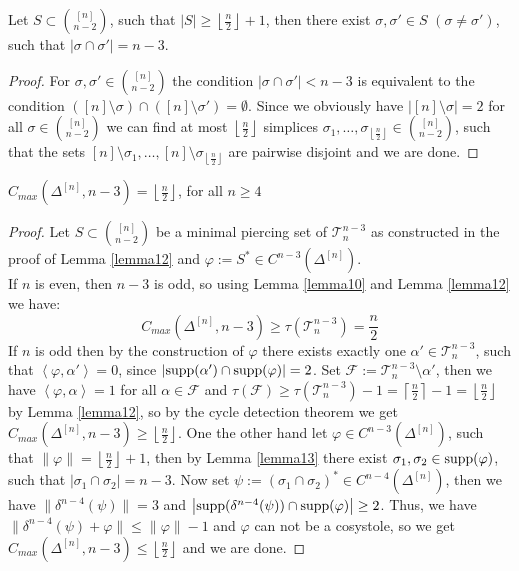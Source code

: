 \begin{lem}\label{lemma13}
Let \(S\subset\binom{[n]}{n-2}\), such that \(\left|S\right|\geq\left\lfloor\frac{n}{2}\right\rfloor+1\), then there exist \(\sigma,\sigma'\in S\) \((\sigma\neq\sigma')\), such that \(\left|\sigma\cap\sigma'\right|=n-3\).
\begin{proof}
For \(\sigma,\sigma'\in\binom{[n]}{n-2}\) the condition \(\left|\sigma\cap\sigma'\right|<n-3\) is equivalent to the condition \(([n]\setminus\sigma)\cap([n]\setminus\sigma')=\emptyset\). Since we obviously have \(\left|[n]\setminus\sigma\right|=2\) for all \(\sigma\in\binom{[n]}{n-2}\) we can find at most \(\left\lfloor\frac{n}{2}\right\rfloor\) simplices \(\sigma_1,\ldots,\sigma_{\left\lfloor\frac{n}{2}\right\rfloor}\in\binom{[n]}{n-2}\), such that the sets \([n]\setminus\sigma_1,\ldots,[n]\setminus\sigma_{\left\lfloor\frac{n}{2}\right\rfloor}\) are pairwise disjoint and we are done.
\end{proof}
\end{lem}

\begin{thm}
\(C_{max}(\Delta^{[n]},n-3)=\left\lfloor\frac{n}{2}\right\rfloor\), for all \(n\geq 4\)
\begin{proof}
Let \(S\subset\binom{[n]}{n-2}\) be a minimal piercing set of \(\mathcal{T}_n^{n-3}\) as constructed in the proof of Lemma \ref{lemma12} and \(\varphi:=S^*\in C^{n-3}(\Delta^{[n]})\).\\
If \(n\) is even, then \(n-3\) is odd, so using Lemma \ref{lemma10} and Lemma \ref{lemma12} we have:
\[
C_{max}(\Delta^{[n]},n-3)\geq\tau(\mathcal{T}_n^{n-3})=\frac{n}{2}
\]
If \(n\) is odd then by the construction of \(\varphi\) there exists exactly one \(\alpha'\in\mathcal{T}_n^{n-3}\), such that \(\left\langle\varphi,\alpha'\right\rangle=0\), since \(\left|\mathrm{supp}(\alpha')\cap \mathrm{supp}(\varphi)\right|=2\). Set \(\mathcal{F}:=\mathcal{T}_n^{n-3}\setminus\alpha'\), then we have \(\left\langle\varphi,\alpha\right\rangle=1\) for all \(\alpha\in\mathcal{F}\) and \(\tau(\mathcal{F})\geq\tau(\mathcal{T}_n^{n-3})-1=\left\lceil\frac{n}{2}\right\rceil-1=\left\lfloor\frac{n}{2}\right\rfloor\) by Lemma \ref{lemma12}, so by the cycle detection theorem we get \(C_{max}(\Delta^{[n]},n-3)\geq\left\lfloor\frac{n}{2}\right\rfloor\). One the other hand let \(\varphi\in C^{n-3}(\Delta^{[n]})\), such that \(\|\varphi\|=\left\lfloor\frac{n}{2}\right\rfloor+1\), then by Lemma \ref{lemma13} there exist \(\sigma_1,\sigma_2\in \mathrm{supp}(\varphi)\), such that \(\left|\sigma_1\cap\sigma_2\right|=n-3\). Now set \(\psi:=(\sigma_1\cap\sigma_2)^*\in C^{n-4}(\Delta^{[n]})\), then we have \(\|\delta^{n-4}(\psi)\|=3\) and \(\left|\mathrm{supp}(\delta^{n-4}(\psi))\cap \mathrm{supp}(\varphi)\right|\geq 2\). Thus, we have \(\|\delta^{n-4}(\psi)+\varphi\|\leq\|\varphi\|-1\) and \(\varphi\) can not be a cosystole, so we get \(C_{max}(\Delta^{[n]},n-3)\leq\left\lfloor\frac{n}{2}\right\rfloor\) and we are done.
\end{proof}
\end{thm}

